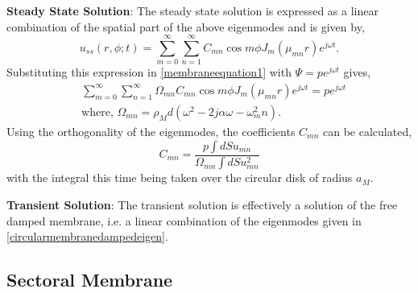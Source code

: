\noindent\textbf{Steady State Solution}: The steady state solution is expressed as a linear combination of the spatial part
of the above eigenmodes and is given by,
\begin{equation}\label{membraness1}
 u_{ss}(r,\phi ;t)=\displaystyle\sum^\infty_{m=0}\sum^\infty_{n=1} C_{mn}\cos m\phi J_m(\mu_{mn} r)e^{j\omega t}.
\end{equation}
Substituting this expression in \eqref{membraneequation1} with $\Psi=pe^{j\omega t}$ gives,
\begin{align}
 &\displaystyle\sum^\infty_{m=0}\sum^\infty_{n=1} \Omega_{mn}C_{mn}\cos m\phi J_m(\mu_{mn} r)e^{j\omega t}=pe^{j\omega t}\label{membraness2}\\
 &\text{where,  }\Omega_{mn}=\rho_M d (\omega^2-2j\alpha\omega-\omega^2_mn)\label{omegafirstdef}.
\end{align}
Using the orthogonality of the eigenmodes, the coefficients $C_{mn}$ can be calculated,
\begin{equation}
 C_{mn}=\frac{p\int dS u_{mn}}{\Omega_{mn}\int dS u^2_{mn}}
\end{equation}
with the integral this time being taken over the circular disk of radius $a_M$.

\vspace{\baselineskip}
\noindent\textbf{Transient Solution}: The transient solution is effectively a solution of the free damped membrane, i.e. a linear 
combination of the eigenmodes given in \eqref{circularmembranedampedeigen}.
\subsection{Sectoral Membrane}